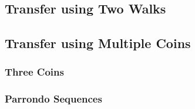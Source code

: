 \subsection{Transfer using Two Walks}
\lipsum[1]
\subsection{Transfer using Multiple Coins}
\subsubsection{Three Coins}
\lipsum[1]
\subsubsection{Parrondo Sequences}
\lipsum[1]